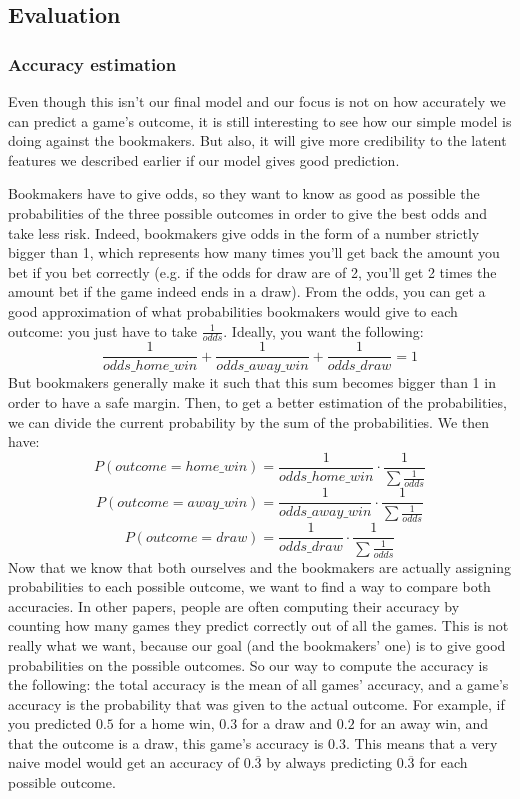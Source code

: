 \documentclass[10pt,conference,onecolumn]{IEEEtran}
\begin{document}
\subsection{Evaluation}

\subsubsection{Accuracy estimation} \label{ssec:accuracy}
Even though this isn't our final model and our focus is not on how accurately we can predict a game's outcome, it is still interesting to see how our simple model is doing against the bookmakers. But also, it will give more credibility to the latent features we described earlier if our model gives good prediction.

Bookmakers have to give odds, so they want to know as good as possible the probabilities of the three possible outcomes in order to give the best odds and take less risk. Indeed, bookmakers give odds in the form of a number strictly bigger than 1, which represents how many times you'll get back the amount you bet if you bet correctly (e.g. if the odds for draw are of 2, you'll get 2 times the amount bet if the game indeed ends in a draw). From the odds, you can get a good approximation of what probabilities bookmakers would give to each outcome: you just have to take $\frac{1}{odds}$. Ideally, you want the following: 
$$\frac{1}{odds\_home\_win} + \frac{1}{odds\_away\_win} + \frac{1}{odds\_draw} = 1$$
But bookmakers generally make it such that this sum becomes bigger than 1 in order to have a safe margin. Then, to get a better estimation of the probabilities, we can divide the current probability by the sum of the probabilities. We then have:
$$P(outcome=home\_win) = \frac{1}{odds\_home\_win} \cdot \frac{1}{\sum{\frac{1}{odds}}}$$
$$P(outcome=away\_win) = \frac{1}{odds\_away\_win} \cdot \frac{1}{\sum{\frac{1}{odds}}}$$
$$P(outcome=draw) = \frac{1}{odds\_draw} \cdot \frac{1}{\sum{\frac{1}{odds}}}$$
Now that we know that both ourselves and the bookmakers are actually assigning probabilities to each possible outcome, we want to find a way to compare both accuracies. In other papers, people are often computing their accuracy by counting how many games they predict correctly out of all the games. This is not really what we want, because our goal (and the bookmakers' one) is to give good probabilities on the possible outcomes. So our way to compute the accuracy is the following: the total accuracy is the mean of all games' accuracy, and a game's accuracy is the probability that was given to the actual outcome. For example, if you predicted $0.5$ for a home win, $0.3$ for a draw and $0.2$ for an away win, and that the outcome is a draw, this game's accuracy is $0.3$. This means that a very naive model would get an accuracy of $0.\overline{3}$ by always predicting $0.\overline{3}$ for each possible outcome.
\end{document}
